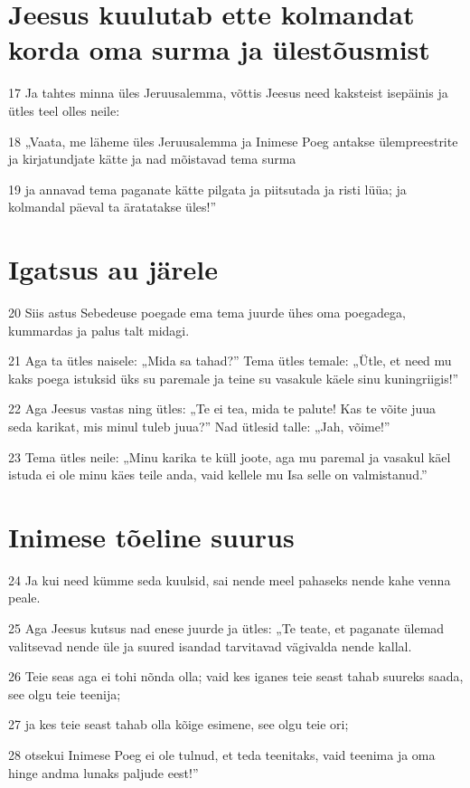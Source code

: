\section*{Jeesus kuulutab ette kolmandat korda oma surma ja ülestõusmist}

\par 17 Ja tahtes minna üles Jeruusalemma, võttis Jeesus need kaksteist isepäinis ja ütles teel olles neile:
\par 18 „Vaata, me läheme üles Jeruusalemma ja Inimese Poeg antakse ülempreestrite ja kirjatundjate kätte ja nad mõistavad tema surma
\par 19 ja annavad tema paganate kätte pilgata ja piitsutada ja risti lüüa; ja kolmandal päeval ta äratatakse üles!”

\section*{Igatsus au järele}

\par 20 Siis astus Sebedeuse poegade ema tema juurde ühes oma poegadega, kummardas ja palus talt midagi.
\par 21 Aga ta ütles naisele: „Mida sa tahad?” Tema ütles temale: „Ütle, et need mu kaks poega istuksid üks su paremale ja teine su vasakule käele sinu kuningriigis!”
\par 22 Aga Jeesus vastas ning ütles: „Te ei tea, mida te palute! Kas te võite juua seda karikat, mis minul tuleb juua?” Nad ütlesid talle: „Jah, võime!”
\par 23 Tema ütles neile: „Minu karika te küll joote, aga mu paremal ja vasakul käel istuda ei ole minu käes teile anda, vaid kellele mu Isa selle on valmistanud.”

\section*{Inimese tõeline suurus}

\par 24 Ja kui need kümme seda kuulsid, sai nende meel pahaseks nende kahe venna peale.
\par 25 Aga Jeesus kutsus nad enese juurde ja ütles: „Te teate, et paganate ülemad valitsevad nende üle ja suured isandad tarvitavad vägivalda nende kallal.
\par 26 Teie seas aga ei tohi nõnda olla; vaid kes iganes teie seast tahab suureks saada, see olgu teie teenija;
\par 27 ja kes teie seast tahab olla kõige esimene, see olgu teie ori;
\par 28 otsekui Inimese Poeg ei ole tulnud, et teda teenitaks, vaid teenima ja oma hinge andma lunaks paljude eest!”

